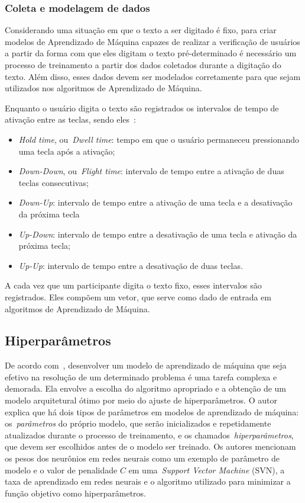 \subsubsection{Coleta e modelagem de dados}\label{subsubsec:coleta_e_modelagem}

Considerando uma situação em que o texto a ser digitado é fixo, para criar modelos de Aprendizado de Máquina capazes de realizar a verificação de usuários a partir da forma com que eles digitam o texto pré-determinado é necessário um processo de treinamento a partir dos dados coletados durante a digitação do texto. Além disso, esses dados devem ser modelados corretamente para que sejam utilizados nos algoritmos de Aprendizado de Máquina.

Enquanto o usuário digita o texto são registrados os intervalos de tempo de ativação entre as teclas, sendo eles~\cite{Dias2023keyrecs}:

\begin{itemize}
    \item{\textit{Hold time}, ou~\textit{Dwell time}}: tempo em que o usuário permaneceu pressionando uma tecla após a ativação;
    \item{\textit{Down-Down}, ou~\textit{Flight time}}: intervalo de tempo entre a ativação de duas teclas consecutivas;
    \item{\textit{Down-Up}}: intervalo de tempo entre a ativação de uma tecla e a desativação da próxima tecla
    \item{\textit{Up-Down}}: intervalo de tempo entre a desativação de uma tecla e ativação da próxima tecla;
    \item{\textit{Up-Up}}: intervalo de tempo entre a desativação de duas teclas.
\end{itemize}

A cada vez que um participante digita o texto fixo, esses intervalos são registrados. Eles compõem um vetor, que serve como dado de entrada em algoritmos de Aprendizado de Máquina. 


\subsection{Hiperparâmetros}\label{subsec:ajuste_de_hiperparametros}

De acordo com~, desenvolver um modelo de aprendizado de máquina que seja efetivo na resolução de um determinado problema é uma tarefa complexa e demorada. Ela envolve a escolha do algoritmo apropriado e a obtenção de um modelo arquitetural ótimo por meio do ajuste de hiperparâmetros. O autor explica que há dois tipos de parâmetros em modelos de aprendizado de máquina: os~\textit{parâmetros} do próprio modelo, que serão inicializados e repetidamente atualizados durante o processo de treinamento, e os chamados~\textit{hiperparâmetros}, que devem ser escolhidos antes de o modelo ser treinado. Os autores mencionam os pesos dos neurônios em redes neurais como um exemplo de parâmetro de modelo e o valor de penalidade $C$ em uma~\textit{Support Vector Machine} (SVN), a taxa de aprendizado em redes neurais e o algoritmo utilizado para minimizar a função objetivo como hiperparâmetros.

